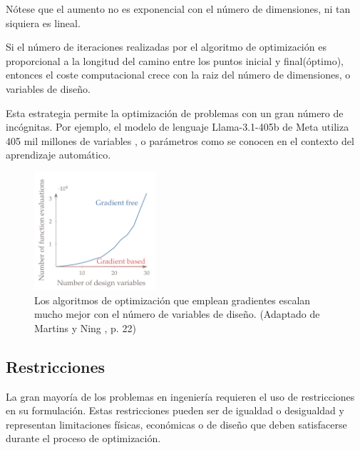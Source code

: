 Nótese que el aumento no es exponencial con el número de dimensiones, ni
tan siquiera es lineal.

Si el número de iteraciones realizadas por el algoritmo de optimización
es proporcional a la longitud del camino entre los puntos inicial y final(óptimo),
entonces el coste computacional crece con la raiz del número de dimensiones, o
variables de diseño.

Esta estrategia permite la optimización de problemas con un gran número de
incógnitas. Por ejemplo, el modelo de lenguaje Llama-3.1-405b de Meta
utiliza 405 mil millones de variables \cite{dubey2024llama}, o parámetros como
se conocen en el contexto del aprendizaje automático.


\begin{figure}[h]
    \centering
    \includegraphics[width=0.4\textwidth]{./capitulos/metodologia/images/gradient_based_vs_gradient_free.png}
    \caption{Los algoritmos de optimización que emplean gradientes escalan mucho mejor con el número de variables de diseño. (Adaptado de Martins y Ning \cite{mdobook}, p. 22)}
    \label{fig:gradient_based_vs_gradient_free}
\end{figure}


\subsection{Restricciones}

La gran mayoría de los problemas en ingeniería requieren el uso de
restricciones en su formulación. Estas restricciones pueden ser de igualdad o
desigualdad y representan limitaciones físicas, económicas o de diseño que
deben satisfacerse durante el proceso de optimización.
